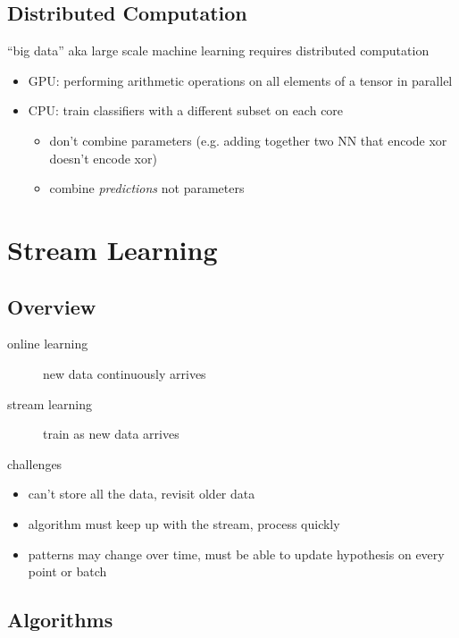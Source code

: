 \documentclass[]{article}
\theoremstyle{definition}
\begin{document}
\subsection{Distributed Computation}
\label{sub:distributed_computation}
``big data'' aka large scale machine learning requires distributed computation
\begin{itemize}
    \item GPU: performing arithmetic operations on all elements of a tensor in parallel
    \item CPU: train classifiers with a different subset on each core
        \begin{itemize}
            \item don't combine parameters (e.g. adding together two NN that encode xor doesn't encode xor)
            \item combine \textit{predictions} not parameters
        \end{itemize}
\end{itemize}

\section{Stream Learning}
\label{sec:stream_learning}

\subsection{Overview}
\label{sub:stream_learning_overview}

\begin{description}
    \item[online learning] new data continuously arrives
    \item[stream learning] train as new data arrives
\end{description}

challenges
\begin{itemize}
    \item can't store all the data, revisit older data
    \item algorithm must keep up with the stream, process quickly
    \item patterns may change over time, must be able to update hypothesis on every point or batch
\end{itemize}

\subsection{Algorithms}
\label{sub:algorithms}
\end{document}
